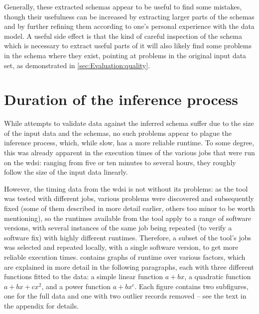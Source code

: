 Generally, these extracted \glspl{schema} appear to be useful to find some mistakes,
though their usefulness %
can be increased by extracting larger parts of the \glspl{schema}
and by further refining them according to one’s personal experience with the data model.
A useful side effect is that the kind of careful inspection of the \gls{schema}
which is necessary to extract useful parts of it
will also likely find some problems in the \gls{schema} where they exist,
pointing at problems %
in the original input data set,
as demonstrated in \cref{sec:Evaluation:quality}.

\section{Duration of the inference process}
\label{sec:Evaluation:duration}

While attempts to validate data against the inferred \gls{schema}
suffer due to the size of the input data and the \glspl{schema},
no such problems appear to plague the inference process,
which, while slow, has a more reliable runtime.
To some degree, this was already apparent in the execution times
of the various jobs that were run on the \gls{wdsi}:
ranging from five or ten minutes to several hours,
they roughly follow the size of the input data linearly.

However, the timing data from the \gls{wdsi}
is not without its problems:
as the tool was tested with different jobs,
various problems were discovered and subsequently fixed
(some of them described in more detail earlier, others too minor to be worth mentioning),
so the runtimes available from the tool apply to a range of software versions,
with several instances of the same job being repeated (to verify a software fix)
with highly different runtimes.
Therefore, a subset of the tool’s jobs was selected
and repeated locally, with a single software version,
to get more reliable execution times.
 contains graphs of runtime over various factors,
which are explained in more detail in the following paragraphs,
each with three different functions fitted to the data:
a simple linear function $a+bx$,
a quadratic function $a+bx+cx^2$,
and a power function $a+bx^c$.
Each figure contains two subfigures,
one for the full data and one with two outlier records removed –
see the text in the appendix for details.

